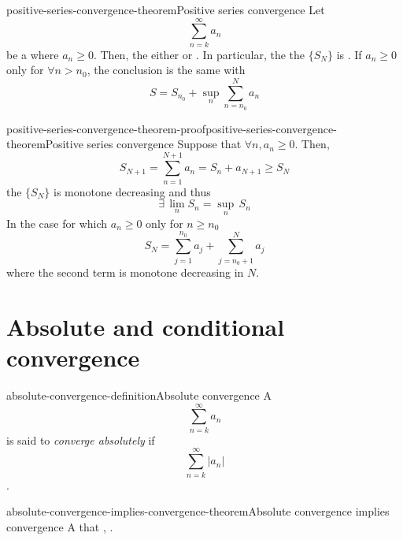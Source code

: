\documentclass[preview]{standalone}
\begin{document}
\begin{snippettheorem}{positive-series-convergence-theorem}{Positive series convergence}
    Let \[ \sum_{n=k}^\infty a_n \]
    be a \series where \(a_n \geq 0\). Then, the \series either \seriesdiverges
    or \seriesconverges. In particular, the \series \seriesconverges \ifandonlyif the \partialsum
    \sequence \(\{S_N\}\) is .
    If \(a_n \geq 0\) only \eventually for \(\forall n>n_0\),
    the conclusion is the same with
    \[
        S = S_{n_0} + \underset{n}{\sup}
        \sum_{n=n_0}^N a_n
    \]
\end{snippettheorem}


\begin{snippetproof}{positive-series-convergence-theorem-proof}{positive-series-convergence-theorem}{Positive series convergence}
    Suppose that \(\forall n, a_n \geq 0\). Then,
    \[
        S_{N+1} = \sum_{n=1}^{N+1} a_n = S_n + a_{N+1} \geq S_N
    \]
    the \sequence \(\{S_N\}\) is monotone decreasing and thus %
    \[ \exists\, \underset{n}{\lim} S_n = \underset{n}{\sup}\, S_n \]
    In the case for which \(a_n \geq 0\) only for \(n\geq n_0\)
    \[ S_N = \sum_{j=1}^{n_0} a_j + \sum_{j=n_0 + 1}^N a_j \]
    where the second term is monotone decreasing in \(N\).
\end{snippetproof}

\section{Absolute and conditional convergence}

\begin{snippetdefinition}{absolute-convergence-definition}{Absolute convergence}
    A \series \[\sum_{n=k}^\infty a_n\] is said to \emph{converge absolutely} if
    \[\sum_{n=k}^\infty |a_n|\] \seriesconverges.
\end{snippetdefinition}


\begin{snippettheorem}{absolute-convergence-implies-convergence-theorem}{Absolute convergence implies convergence}
    A \series that \convergesabsolutely, \seriesconverges.
\end{snippettheorem}
\end{document}
